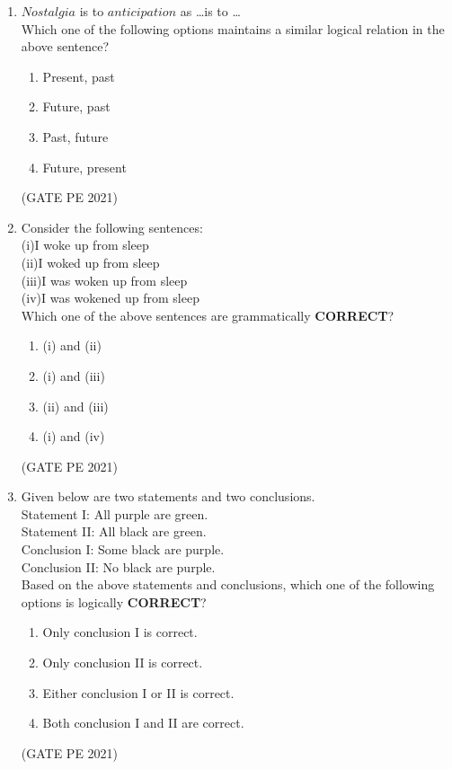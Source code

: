 \documentclass[journal,12pt,onecolumn]{IEEEtran}
\theoremstyle{remark}
\begin{document}
\begin{enumerate}
\item $Nostalgia$ is to $anticipation$ as \dots is to \dots\\
Which one of the following options maintains a similar logical relation in the above sentence?
\begin{enumerate}
    \item Present, past
    \item Future, past
    \item Past, future
    \item Future, present
\end{enumerate}
\hfill{(GATE PE 2021)}

\item Consider the following sentences:\\
(i)I woke up from sleep\\
(ii)I woked up from sleep\\
(iii)I was woken up from sleep\\
(iv)I was wokened up from sleep\\
Which one of the above sentences are grammatically \textbf{CORRECT}?
\begin{enumerate}
    \item (i) and (ii)
    \item (i) and (iii)
    \item (ii) and (iii)
    \item (i) and (iv)
\end{enumerate}
\hfill{(GATE PE 2021)}

\item Given below are two statements and two conclusions.\\
Statement I: All purple are green.\\
Statement II: All black are green.\\
Conclusion I: Some black are purple.\\
Conclusion II: No black are purple.\\
Based on the above statements and conclusions, which one of the following options is logically \textbf{CORRECT}?
\begin{enumerate}
    \item Only conclusion I is correct.
    \item Only conclusion II is correct.
    \item Either conclusion I or II is correct.
    \item Both conclusion I and II are correct.
\end{enumerate}
\hfill{(GATE PE 2021)}


\end{enumerate}
\end{document}
